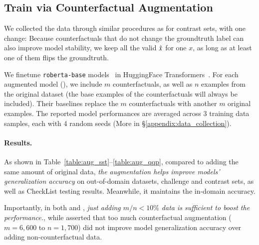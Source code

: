 \subsection{Train via Counterfactual Augmentation}
\label{subsec:augmentation}
We collected the data through similar procedures as for contrast sets, with one change:
Because counterfactuals that do not change the groundtruth label can also improve model stability, we keep all the valid $\hat{x}$ for one $x$, as long as at least one of them flips the groundtruth.

We finetune \texttt{roberta-base} models~\cite{liu2019roberta} in HuggingFace Transformers~\cite{Wolf2019HuggingFacesTS}.
For each augmented model (\maug), we include $m$ counterfactuals, as well as $n$ examples from the original dataset (the base examples of the counterfactuals will always be included).
Their baselines \mcomp replace the $m$ counterfactuals with another $m$ original examples.
The reported model performances are averaged across 3 training data samples, each with 4 random seeds (More in \S\ref{appendix:data_collection}).

\paragraph{Results.}
As shown in Table~\ref{table:aug_sst}--\ref{table:aug_qqp}, compared to adding the same amount of original data, \emph{the augmentation helps improve models' generalization accuracy} on out-of-domain datasets, challenge and contrast sets, as well as CheckList testing results.
Meanwhile, it maintains the in-domain accuracy.

Importantly, in both \nli and \qqp, \emph{just adding $m/n < 10\%$ data is sufficient to boost the performance.}, while \citet{huang2020counterfactually} asserted that too much counterfactual augmentation ($m=6,600$ to $n=1,700$) did not improve model generalization accuracy over adding non-counterfactual data.

